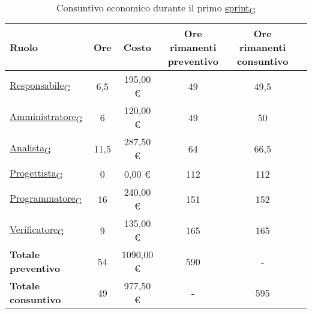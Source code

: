 \begin{table}[!h]
	\centering
	\begin{tabular}{ | l | c | c | c | c | c | }
		\hline
		\textbf{Ruolo}             & \textbf{Ore} & \textbf{Costo} & \textbf{Ore rimanenti preventivo} & \textbf{Ore rimanenti consuntivo} \\
		\hline
		\href{https://7last.github.io/docs/pb/documentazione-interna/glossario\#responsabile}{Responsabile\textsubscript{G}}               & 6,5          & 195,00 €       & 49                                & 49,5                              \\
		\href{https://7last.github.io/docs/pb/documentazione-interna/glossario\#amministratore}{Amministratore\textsubscript{G}}             & 6            & 120,00 €       & 49                                & 50                                \\
		\href{https://7last.github.io/docs/pb/documentazione-interna/glossario\#analista}{Analista\textsubscript{G}}                   & 11,5         & 287,50 €       & 64                                & 66,5                              \\
		\href{https://7last.github.io/docs/pb/documentazione-interna/glossario\#progettista}{Progettista\textsubscript{G}}                & 0            & 0,00 €         & 112                               & 112                               \\
		\href{https://7last.github.io/docs/pb/documentazione-interna/glossario\#programmatore}{Programmatore\textsubscript{G}}              & 16           & 240,00 €       & 151                               & 152                               \\
		\href{https://7last.github.io/docs/pb/documentazione-interna/glossario\#verificatore}{Verificatore\textsubscript{G}}               & 9            & 135,00 €       & 165                               & 165                               \\
		\hline
		\textbf{Totale preventivo} & 54           & 1090,00 €      & 590                               & -                                 \\
		\hline
		\textbf{Totale consuntivo} & 49           & 977,50 €       & -                                 & 595                               \\
		\hline
	\end{tabular}
	\caption{Consuntivo economico durante il primo \href{https://7last.github.io/docs/pb/documentazione-interna/glossario\#sprint}{sprint\textsubscript{G}}}
	
\end{table}

